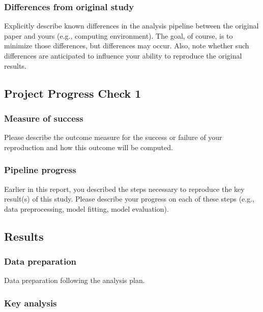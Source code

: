 \documentclass[
  letterpaper,
  DIV=11,
  numbers=noendperiod]{scrartcl}
\begin{document}
\subsubsection{Differences from original
study}\label{differences-from-original-study}

Explicitly describe known differences in the analysis pipeline between
the original paper and yours (e.g., computing environment). The goal, of
course, is to minimize those differences, but differences may occur.
Also, note whether such differences are anticipated to influence your
ability to reproduce the original results.

\subsection{Project Progress Check 1}\label{project-progress-check-1}

\subsubsection{Measure of success}\label{measure-of-success}

Please describe the outcome measure for the success or failure of your
reproduction and how this outcome will be computed.

\subsubsection{Pipeline progress}\label{pipeline-progress}

Earlier in this report, you described the steps necessary to reproduce
the key result(s) of this study. Please describe your progress on each
of these steps (e.g., data preprocessing, model fitting, model
evaluation).

\subsection{Results}\label{results}

\subsubsection{Data preparation}\label{data-preparation}

Data preparation following the analysis plan.

\subsubsection{Key analysis}\label{key-analysis}
\end{document}
